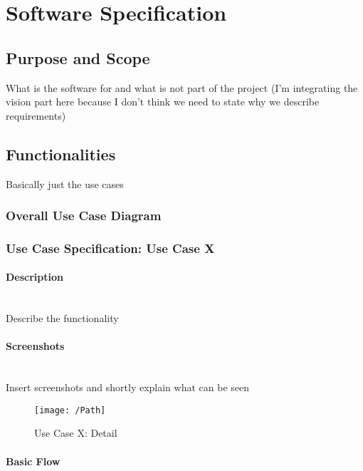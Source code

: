
\section{Software Specification}
\label{sec:domainB}

\subsection{Purpose and Scope}
\label{sec:domainBa}
What is the software for and what is not part of the project (I'm integrating the vision part here because I don't think we need to state why we describe requirements)

\subsection{Functionalities}
\label{sec:domainBb}
Basically just the use cases

\subsubsection{Overall Use Case Diagram}
\label{sec:domainBba}

\subsubsection{Use Case Specification: Use Case X}
\label{sec:domainBbb}

\paragraph{Description}\mbox{}\\
Describe the functionality

\paragraph{Screenshots}\mbox{}\\
Insert screenshots and shortly explain what can be seen
\begin{figure}[ScreenshotX] 
	\centering
	\texttt{[image: /Path]}
	\caption{Use Case X: Detail}
	\label{fig:useCaseXDetailY}
\end{figure}

\paragraph{Basic Flow} \mbox{}\\

